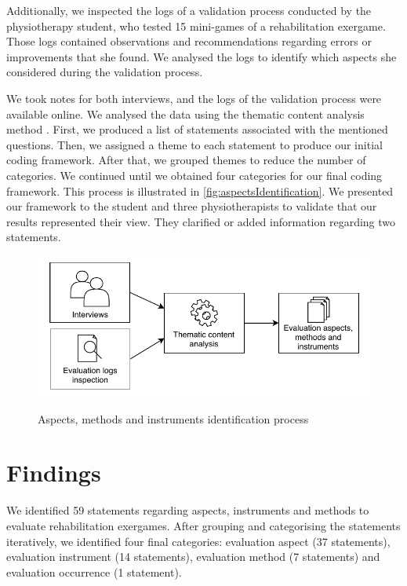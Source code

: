 Additionally, we inspected the logs of a validation process conducted by the physiotherapy student, who tested 15 mini-games of a rehabilitation exergame. Those logs contained observations and recommendations regarding errors or improvements that she found. We analysed the logs to identify which aspects she considered during the validation process.

We took notes for both interviews, and the logs of the validation process were available online. We analysed the data using the thematic content analysis method \autocite{Burnard2008}. First, we produced a list of statements associated with the mentioned questions. Then, we assigned a theme to each statement to produce our initial coding framework. After that, we grouped themes to reduce the number of categories. We continued until we obtained four categories for our final coding framework. This process is illustrated in \autoref{fig:aspectsIdentification}. We presented our framework to the student and three physiotherapists to validate that our results represented their view. They clarified or added information regarding two statements.

\begin{figure}[htb]
\myfloatalign
{\includegraphics[width=\linewidth]{gfx/aspects/aspectsIdentification}} \quad
\caption{Aspects, methods and instruments identification process}\label{fig:aspectsIdentification}
\end{figure}

\section{Findings} %
\label{sec:findings_aspects}

We identified 59 statements regarding aspects, instruments and methods to evaluate rehabilitation exergames. After grouping and categorising the statements iteratively, we identified four final categories: evaluation aspect (37 statements), evaluation instrument (14 statements), evaluation method (7 statements) and evaluation occurrence (1 statement).

